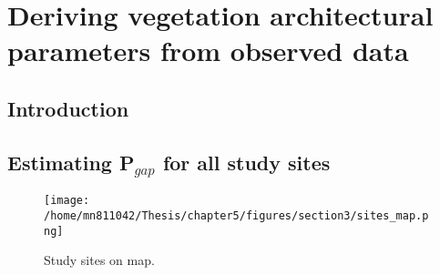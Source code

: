 \documentclass[a4paper,11pt]{report}
\title{}
\author{Renato Kerches Braghiere \\ This document was written in \LaTeX \\ Number of words: 12213}
\date{\today}
\begin{document}
\maketitle
\setcounter{chapter}{4} %

\chapter{Deriving vegetation architectural parameters from observed data}

\section{Introduction}\label{introduction}

\section{Estimating P$_{gap}$ for all study sites}\label{section:hemiphotos}

\begin{figure}
\centering
\texttt{[image: /home/mn811042/Thesis/chapter5/figures/section3/sites\_map.png]}
\caption{Study sites on map.} 
\label{f:studysites}
\end{figure}
\end{document}
